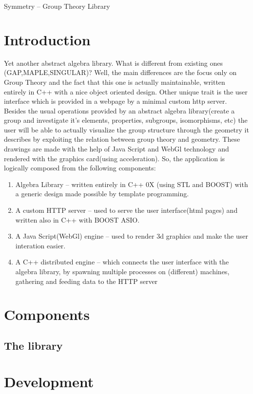 \documentclass[a4paper,11pt]{article}
\begin{document}
{
\huge
Symmetry -- Group Theory Library
}

\tableofcontents

\section{Introduction}
	Yet another abstract algebra library. What is different from existing ones (GAP,MAPLE,SINGULAR)? Well, the main differences are the focus only on Group Theory and the fact that this one is actually maintainable, written entirely in C++ with a nice object oriented design. Other unique trait is the user interface which is provided in a webpage by a minimal custom http server. Besides the usual operations provided by an abstract algebra library(create a group and investigate it's elements, properties, subgroups, isomorphisms, etc) the user will be able to actually visualize the group structure through the geometry it describes by exploiting the relation between group theory and geometry. These drawings are made with the help of Java Script and WebGl technology and rendered with the graphics card(using acceleration).
	So, the application is logically composed from the following components:
\begin{enumerate}
\item
Algebra Library -- written entirely in C++ 0X (using STL and BOOST) with a generic design made possible by template programming.
\item
A custom HTTP server -- used to serve the user interface(html pages) and written also in C++ with BOOST ASIO.
\item
A Java Script(WebGl) engine -- used to render 3d graphics and make the user interation easier.
\item
A C++ distributed engine -- which connects the user interface with the algebra library, by spawning multiple processes on (different) machines, gathering and feeding data to the HTTP server
\end{enumerate}

\section{Components}

\subsection{The library}
\section{Development}
\end{document}

